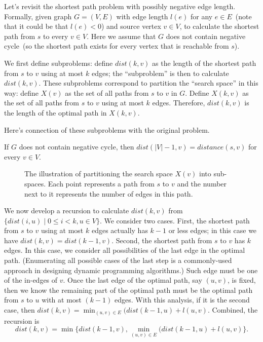 Let's revisit the shortest path problem with possibly negative edge length.
Formally, given graph $G = (V, E)$ with edge length $l(e)$ for any $e\in E$~(note
that it could be that $l(e) < 0$) and source vertex $v\in V$,
to calculate the shortest path from $s$ to every $v\in V$.
Here we assume that $G$ does not contain negative cycle~(so
the shortest path exists for every vertex that is reachable from $s$).

We first define subproblems: define $dist(k,v)$ as the length
of the shortest path from $s$ to $v$ using at most $k$ edges;
the ``subproblem'' is then to calculate $dist(k,v)$.
These subproblems correspond to partition the ``search space''
in this way: define $X(v)$ as the set of all paths from $s$ to $v$ in $G$.
Define $X(k, v)$ as the set of all paths from $s$ to $v$ using
at most $k$ edges. Therefore, $dist(k,v)$ is the length
of the optimal path in $X(k,v)$.

Here's connection of these subproblems with the original problem.
\begin{fact}
If $G$ does not contain negative cycle, then $dist(|V| - 1, v) = distance(s, v)$ for every $v\in V$.
\end{fact}

\begin{figure}[h]
\centering{}
\caption{The illustration of partitioning the search space $X(v)$ into sub-spaces.
Each point represents a path from $s$ to $v$ and the number next to it represents the
number of edges in this path.}
\label{fig:space}
\end{figure}

We now develop a recursion to calculate $dist(k,v)$ from $\{dist(i, u) \mid 0 \le i < k, u\in V\}$.
We consider two cases. First, the shortest path from $s$ to $v$ using at most $k$ edges actually has $k - 1$ or less edges;
in this case we have $dist(k, v) = dist(k - 1, v)$.
Second, the shortest path from $s$ to $v$ has $k$ edges. In this case,
we consider all possibilities of the last edge in the optimal path. (Enumerating
all possible cases of the last step is a commonly-used approach in designing dynamic programming algorithms.)
Such edge must be one of the in-edges of $v$. Once the last edge of the optimal path, say $(u,v)$, is fixed,
then we know the remaining part of the optimal path must be the optimal path from $s$ to $u$ with at most $(k - 1)$ edges.
With this analysis, if it is the second case, then $dist(k,v) = \min_{(u,v)\in E} (dist(k-1, u)  + l(u,v)$.
Combined, the recursion is
$$\textstyle dist(k,v) = \min\{dist(k-1, v), \min_{(u,v)\in E} (dist(k-1,u) + l(u,v)\}.$$

